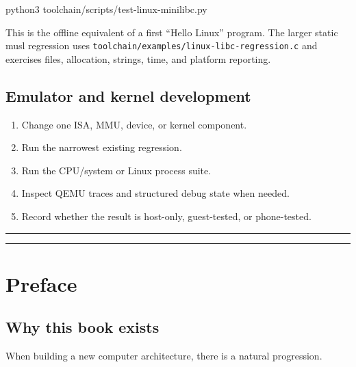\documentclass[
  oneside,
  openany]{book}
\newenvironment{Shaded}{\begin{snugshade}}{\end{snugshade}}
\newcommand{\ExtensionTok}[1]{#1}
\newcommand{\NormalTok}[1]{#1}
\providecommand{\tightlist}{%
  \setlength{\itemsep}{0pt}\setlength{\parskip}{0pt}}
\begin{document}
\begin{Shaded}
\begin{Highlighting}[]
\ExtensionTok{python3}\NormalTok{ toolchain/scripts/test{-}linux{-}minilibc.py}
\end{Highlighting}
\end{Shaded}

This is the offline equivalent of a first ``Hello Linux'' program. The
larger static musl regression uses
\texttt{toolchain/examples/linux-libc-regression.c} and exercises files,
allocation, strings, time, and platform reporting.

\hypertarget{emulator-and-kernel-development}{%
\section{Emulator and kernel
development}\label{emulator-and-kernel-development}}

\begin{enumerate}
\def\labelenumi{\arabic{enumi}.}
\tightlist
\item
  Change one ISA, MMU, device, or kernel component.
\item
  Run the narrowest existing regression.
\item
  Run the CPU/system or Linux process suite.
\item
  Inspect QEMU traces and structured debug state when needed.
\item
  Record whether the result is host-only, guest-tested, or phone-tested.
\end{enumerate}

\begin{center}\rule{0.5\linewidth}{0.5pt}\end{center}

\begin{center}\rule{0.5\linewidth}{0.5pt}\end{center}

\hypertarget{preface}{%
\chapter{Preface}\label{preface}}

\hypertarget{why-this-book-exists}{%
\section{Why this book exists}\label{why-this-book-exists}}

When building a new computer architecture, there is a natural
progression.
\end{document}

